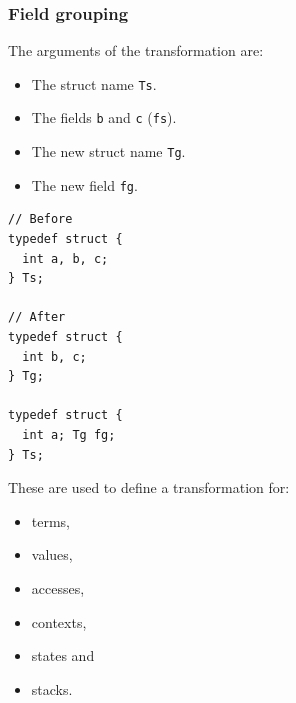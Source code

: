 \begin{frame}[fragile]
\frametitle{Field grouping}

The arguments of the transformation are:
\begin{minipage}{0.55\linewidth}
\begin{itemize}
	\setlength\itemsep{1.5em}
	\item The struct name \texttt{Ts}.
	\item The fields \texttt{b} and \texttt{c} (\texttt{fs}).
	\item The new struct name \texttt{Tg}.
	\item The new field \texttt{fg}.
\end{itemize}
\end{minipage}%
\begin{minipage}{0.35\linewidth}
\begin{lstlisting}[style=Cstyle, basicstyle=\scriptsize]
// Before
typedef struct {
  int a, b, c;
} Ts;

// After
typedef struct {
  int b, c;
} Tg;

typedef struct {
  int a; Tg fg;
} Ts;
\end{lstlisting}
\end{minipage}

\bigskip \pause

These are used to define a transformation for:
\\[0.75em]
\begin{minipage}{0.3\linewidth}

\begin{itemize}
	\item terms,
	\item values,
\end{itemize}
\end{minipage}%
\begin{minipage}{0.3\linewidth}
\begin{itemize}
	\item accesses,
	\item contexts,
\end{itemize}
\end{minipage}%
\begin{minipage}{0.3\linewidth}
\begin{itemize}
	\item states and
	\item stacks.
\end{itemize}
\end{minipage}

\end{frame}


